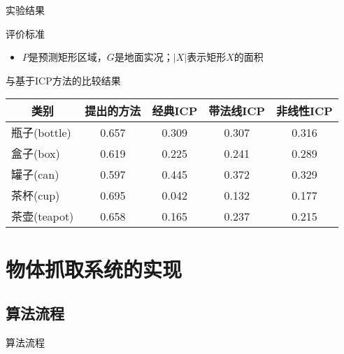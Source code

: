 \documentclass[xcolor=table,compress,blue]{beamer}
\begin{document}
	\begin{frame}{实验结果}
		\vspace{-6pt}
		\begin{exampleblock}{评价标准}
			
			\begin{itemize}
				\item \footnotesize{$P$是预测矩形区域，$G$是地面实况；$|X|$表示矩形$X$的面积}
			\end{itemize}
		\end{exampleblock}
		\vspace{-18pt}
		\begin{exampleblock}{与基于ICP方法的比较结果}
			\begin{table}[htbp]
				\centering
				\begin{tabular}{lcccc}
					\toprule
					\multicolumn{1}{c}{类别}    & \multicolumn{1}{l}{提出的方法} & \multicolumn{1}{l}{经典ICP} & \multicolumn{1}{l}{带法线ICP} & 非线性ICP			 \\
					\midrule
					瓶子(bottle)   & 0.657 & 0.309 & 0.307 & 0.316			 \\
					盒子(box)    & 0.619 & 0.225 & 0.241 & 0.289			 \\
					罐子(can)    & 0.597 & 0.445 & 0.372 & 0.329			 \\
					茶杯(cup)     & 0.695 & 0.042 & 0.132 & 0.177			 \\
					茶壶(teapot)    & 0.658 & 0.165 & 0.237 & 0.215			 \\
					\bottomrule
				\end{tabular}%
				\label{TAB RegistrationCompare}%
			\end{table}%
		\end{exampleblock}
	\end{frame}	


\section{物体抓取系统的实现}	
	\subsection{算法流程}
	\begin{frame}{算法流程}
	\end{frame}	
\end{document}
